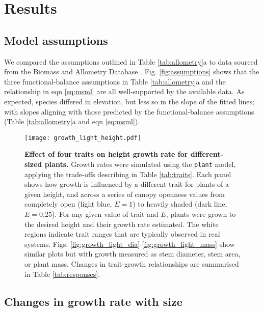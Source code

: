 \documentclass[9pt,twocolumn,twoside,lineno]{pnas-new}
\newcommand{\plant}{\texttt{plant}}
\begin{document}
\section*{Results}

\subsection{Model assumptions}

We compared the assumptions outlined in Table \ref{tab:allometry}a to data sourced from the Biomass and Allometry Database \citep[\textsc{baad}][]{Falster-2015b}. Fig. \ref{fig:assumptions} shows that the three functional-balance assumptions in Table \ref{tab:allometry}a and the relationship in eqn \ref{eq:msml} are all well-supported by the available data. As expected, species differed in elevation, but less so in the slope of the fitted lines; with slopes aligning with those predicted by the functional-balance assumptions (Table \ref{tab:allometry}a and eqn \ref{eq:msml}).

\begin{SCfigure*}[\sidecaptionrelwidth][!ht]
\centering
\texttt{[image: growth\_light\_height.pdf]}
\caption{\textbf{Effect of four traits on height growth rate for different-sized plants.}
Growth rates were simulated using the {\plant} model, applying the trade-offs describing in Table \ref{tab:traits}. Each panel shows how growth is influenced by a different trait for plants of a given height, and across a series of canopy openness values from completely open (light blue,  $E=1$) to heavily shaded (dark line, $E=0.25$). For any given value of trait and $E$, plants were grown to the desired height and their growth rate estimated. The white regions indicate trait ranges that are typically observed in real systems. Figs. \ref{fig:growth_light_dia}-\ref{fig:growth_light_mass} show similar plots but with growth measured as stem diameter, stem area, or plant mass. Changes in trait-growth relationships are summarised in Table \ref{tab:responses}.
\label{fig:growth_light_height}}
\end{SCfigure*}

\subsection{Changes in growth rate with size}
\end{document}
